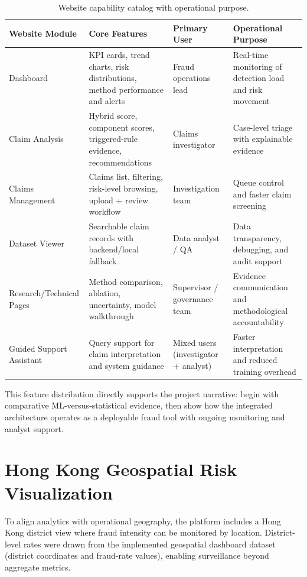 \documentclass[12pt,a4paper]{report}
\begin{document}
\begin{table}[H]
\caption{Website capability catalog with operational purpose.}
\label{tab:website_capability_catalog}
\begin{tabular}{p{}p{}p{}p{}}
\toprule
\textbf{Website Module} & \textbf{Core Features} & \textbf{Primary User} & \textbf{Operational Purpose} \\
\midrule
Dashboard & KPI cards, trend charts, risk distributions, method performance and alerts & Fraud operations lead & Real-time monitoring of detection load and risk movement \\
Claim Analysis & Hybrid score, component scores, triggered-rule evidence, recommendations & Claims investigator & Case-level triage with explainable evidence \\
Claims Management & Claims list, filtering, risk-level browsing, upload + review workflow & Investigation team & Queue control and faster claim screening \\
Dataset Viewer & Searchable claim records with backend/local fallback & Data analyst / QA & Data transparency, debugging, and audit support \\
Research/Technical Pages & Method comparison, ablation, uncertainty, model walkthrough & Supervisor / governance team & Evidence communication and methodological accountability \\
Guided Support Assistant & Query support for claim interpretation and system guidance & Mixed users (investigator + analyst) & Faster interpretation and reduced training overhead \\
\bottomrule
\end{tabular}
\end{table}

This feature distribution directly supports the project narrative: begin with comparative ML-versus-statistical evidence, then show how the integrated architecture operates as a deployable fraud tool with ongoing monitoring and analyst support.

\section{Hong Kong Geospatial Risk Visualization}
To align analytics with operational geography, the platform includes a Hong Kong district view where fraud intensity can be monitored by location. District-level rates were drawn from the implemented geospatial dashboard dataset (district coordinates and fraud-rate values), enabling surveillance beyond aggregate metrics.
\end{document}
